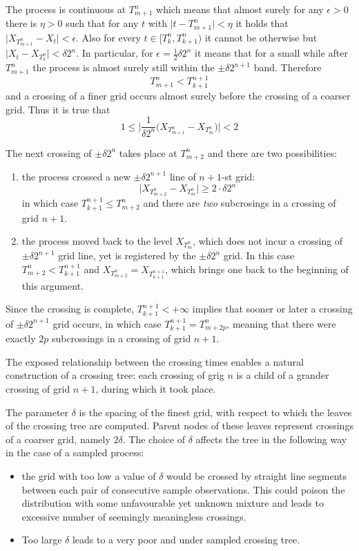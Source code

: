 The process is continuous at $T^n_{m+1}$ which means that almost surely for any
$\epsilon>0$ there is $\eta>0$ such that for any $t$ with $\bigl|t - T^n_{m+1}\bigr| < \eta$
it holds that $\bigl|X_{T^n_{m+1}} - X_t \bigl| < \epsilon$. Also for every $t \in \bigl[ T^n_k, T^n_{k+1} \bigr)$
it cannot be otherwise but $\big | X_t - X_{T^n_k} \big | < \delta 2^n$.  In particular,
for $\epsilon = \frac{1}{2}\delta 2^n$ it means that for a small while after $T^n_{m+1}$
the process is almost surely still within the $\pm \delta 2^{n+1}$ band. Therefore
\[ T^n_{m+1} < T^{n+1}_{k+1} \]
and a crossing of a finer grid occurs almost surely before the crossing of a coarser
grid. Thus it is true that 
\[ 1 \leq \biggl| \frac{1}{\delta 2^n} \bigl( X_{T^n_{m+1}} - X_{T^n_m} \bigr) \biggr| < 2 \]

\noindent The next crossing of $\pm\delta 2^n$ takes place at $T^n_{m+2}$ and there
are two possibilities:
\begin{enumerate}
	\item the process crossed a new $\pm\delta 2^{n+1}$ line of $n+1$-st grid: 
	\[ \big|X_{T^n_{m+2}} - X_{T^n_m}\big|\geq 2\cdot\delta 2^n\] in which case
	$T^{n+1}_{k+1}\leq T^n_{m+2}$ and there are \emph{two} subcrosings in a crossing
	of grid $n+1$.
	\item the process moved back to the level $X_{T^n_m}$, which does not incur a
	crossing of $\pm\delta 2^{n+1}$ grid line, yet is registered by the $\pm\delta 2^n$
	grid. In this case $T^n_{m+2} < T^{n+1}_{k+1}$ and $X_{T^n_{m+2}} = X_{T^{n+1}_{k+1}}$,
	which brings one back to the beginning of this argument.
\end{enumerate}

Since the crossing is complete, $T^{n+1}_{k+1} < +\infty$ implies that sooner or later
a crossing of $\pm\delta 2^{n+1}$ grid occurs, in which case $T^{n+1}_{k+1} = T^n_{m+2p}$,
meaning that there were exactly $2p$ subcrossings in a crossing of grid $n+1$.

The exposed relationship between the crossing times enables a natural construction
of a crossing tree: each crossing of grig $n$ is a child of a grander crossing of
grid $n+1$, during which it took place.

The parameter $\delta$ is the spacing of the finest grid, with respect to which
the leaves of the crossing tree are computed. Parent nodes of these leaves represent
crossings of a coarser grid, namely $2\delta$. The choice of $\delta$ affects the tree
in the following way in the case of a sampled process:
\begin{itemize}
	\item the grid with too low a value of $\delta$ would be crossed by straight
	line segments between each pair of consecutive sample observations. This could
	poison the distribution with some unfavourable yet unknown mixture and leads
	to excessive number of seemingly meaningless crossings.
	\item Too large $\delta$ leads to a very poor and under sampled crossing tree.
\end{itemize}




